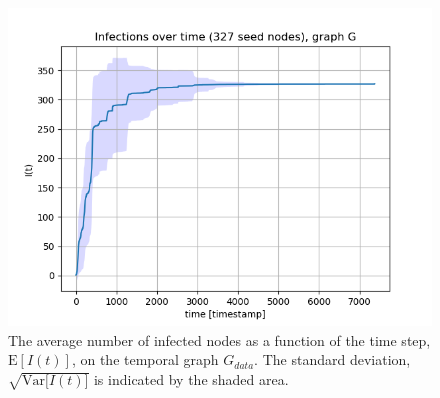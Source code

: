 \documentclass[letterpaper]{article}
\begin{document}
\begin{figure}[ht!]
  \centering
   \includegraphics[width=\textwidth]{img/infections_G.png}
   \caption{The average number of infected nodes as a function of the time step, $\mathrm{E}[I(t)]$, 
 on the temporal graph $G_{data}$. The standard deviation, $\sqrt{\mathrm{Var}{[I(t)}]}$ is indicated by the shaded area.}
   \label{fig:infections_G}
\end{figure}
\end{document}
